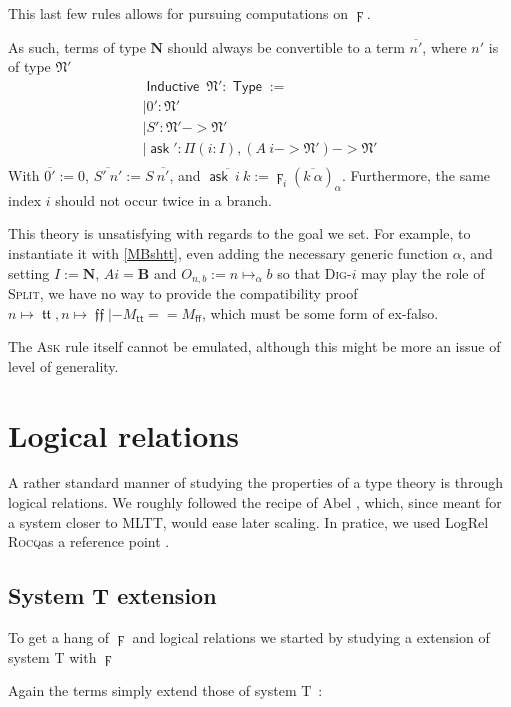 \documentclass[11pt]{article}
\DeclareMathOperator{\Type}{\mathsf{Type}}
\DeclareMathOperator{\ask}{\mathsf{ask}}
\DeclareMathOperator{\Inductive}{\mathsf{Inductive}}
\DeclareMathOperator{\true}{\mathsf{tt}}
\DeclareMathOperator{\false}{\mathsf{ff}}
\DeclareMathOperator{\mtrue}{\mathfrak{tt}}
\DeclareMathOperator{\mfalse}{\mathfrak{ff}}
\newcommand{\ovl}{\overline}
\newcommand{\0}{\mathbf{0}}
\newcommand{\1}{\mathbf{1}}
\newcommand{\nat}{\mathbf{N}}
\newcommand{\mnat}{\mathfrak{N}}
\newcommand{\bool}{\mathbf{B}}
\newcommand{\rocq}{\textsc{Rocq}}
\begin{document}
This last few rules allows for pursuing computations on $\digamma$.

As such, terms of type $\nat$ should always be convertible to a term $\ovl{n'}$, where $n'$ is of type $\mnat'$
$$
\begin{array}{l}
    \Inductive\ \mnat' : \Type := \\
    \mid 0' : \mnat'\\
    \mid S' : \mnat' -> \mnat'\\
    \mid \ask' : \Pi (i : I),(A\ i -> \mnat') -> \mnat'\\
\end{array}
$$
With $\ovl{0'} := 0$, $\ovl{S'\ n'} := S\ \ovl{n'}$, and $\ovl{\ask\ i\ k} := \digamma_i (\ovl{k\ \alpha})_\alpha$. Furthermore, the same index $i$ should not occur twice in a branch.

This theory is unsatisfying with regards to the goal we set. For example, to instantiate it with \ref{MBshtt}, even adding the necessary generic function $\alpha$, and setting $I := \nat$, $A i = \bool$ and $O_{n,b} := n\mapsto_\alpha b$ so that \textsc{Dig}-$i$ may play the role of \textsc{Split}, we  have no way to provide the compatibility proof $n\mapsto \mtrue, n\mapsto \mfalse |- M_{\true} == M_{\false}$, which must be some form of ex-falso.

The \textsc{Ask} rule itself cannot be emulated, although this might be more an issue of level of generality.

\section{Logical relations}\label{LogRel}

A rather standard manner of studying the properties of a type theory is through logical relations. We roughly followed the recipe of Abel \cite{10.1145/3158111}, which, since meant for a system closer to MLTT, would ease later scaling. In pratice, we used LogRel \rocq as a reference point \cite{DBLP:conf/cpp/AdjedjLMPP24}.

\subsection{System T extension}

To get a hang of $\digamma$ and logical relations we started by studying a extension of system T with $\digamma$

Again the terms simply extend those of system T~:
\end{document}
